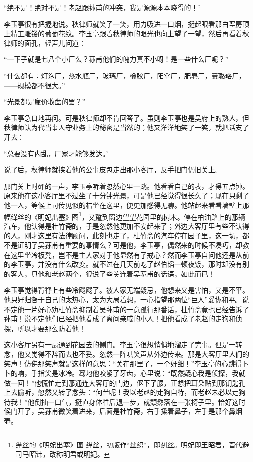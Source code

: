 \par “绝不是！绝对不是！老赵跟荪甫的冲突，我是源源本本晓得的！”
\par 李玉亭很有把握地说。秋律师就笑了一笑，用力吸进一口烟，挺起眼看那白垩房顶上精工雕镂的葡萄花纹。李玉亭跟着秋律师的眼光也向上望了一望，然后再看着秋律师的面孔，轻声儿问道：
\par “一下子就是七八个小厂么？荪甫他们的魄力真不小呀！是一些什么厂呢？”
\par “什么都有：灯泡厂，热水瓶厂，玻璃厂，橡胶厂，阳伞厂，肥皂厂，赛璐珞厂，——规模都不很大。”
\par “光景都是廉价收盘的罢？”
\par 李玉亭急口地再问。可是秋律师却不肯回答了。虽则李玉亭也是吴府上的熟人，但秋律师认为代当事人守业务上的秘密是当然的；他又洋洋地笑了一笑，就把话支了开去：
\par “总要没有内乱，厂家才能够发达。”
\par 说了后，秋律师就挟着他的公事皮包走出那小客厅，反手把门仍旧关上。
\par 那门关上时砰的一声，李玉亭听着忽然心里一跳。他看看自己的表，才得五点钟。原来他在这小客厅里不过坐了十分钟光景，可是他已经觉得很长久了；现在只剩了他一人，等候上司传见似的枯坐在这里，便更加感得无聊。他站起来看看墙壁上那幅缂丝的《明妃出塞》图\footnote{缂丝的《明妃出塞》图 缂丝，初版作“丝织”，即刻丝。明妃即王昭君，晋代避司马昭讳，改称明君或明妃。}，又踅到窗边望望花园里的树木。停在柏油路上的那辆汽车，他认得是杜竹斋的，于是忽然他更加不安起来了；外边大客厅里有些不认得的人，刚才这里有法律顾问，此刻也走了，杜竹斋的汽车停在园子里，这一切，都不是证明了吴荪甫有重要的事情么？可是他，李玉亭，偶然来的时候不凑巧，却教在这里坐冷板凳，岂不是主人家对于他显然有了戒心？然而李玉亭自问他还是从前的李玉亭，并没有什么改变。就不过在几天前吃了赵伯韬一顿夜饭，那时却没有别的客人，只他和老赵两个，很说了些关连着吴荪甫的话语，如此而已！
\par 李玉亭觉得背脊上有些冷飕飕了。被人家无端疑忌，他想来又是害怕，又是不平。他只好归咎于自己的太热心，太为大局着想，一心指望那两位“巨人”妥协和平。说不定他一片好心劝杜竹斋抑制着吴荪甫的一意孤行那番话，杜竹斋竟也已经告诉了荪甫！说不定他们已经把他看成了离间亲戚的小人！把他看成了老赵的走狗和侦探，所以才要那么防着他！
\par 这小客厅另有一扇通到花园去的侧门。李玉亭很想悄悄地溜走了完事。但是一转念，他又觉得不辞而去也不妥。忽然一阵哄笑声从外边传来。那是大客厅里人们的笑声！仿佛那笑声就是这样的意思：“关在那里了，一个奸细！”李玉亭的心跳得卜卜的响，手指尖是冰冷。蓦地他咬紧了牙齿，心里说：“既然疑心我是侦探，我就做一回！”他慌忙走到那通连大客厅的门边，伛下了腰，正想把耳朵贴到那钥匙孔上去偷听，忽然又转了念头：“何苦呢！我以老赵的走狗自待，而老赵未必以走狗待我！”他倒抽一口气，挺直身体往后退一步，就颓然落在一张椅子里。恰好这时候门开了，吴荪甫微笑着进来，后面是杜竹斋，右手揉着鼻子，左手是那个鼻烟壶。
